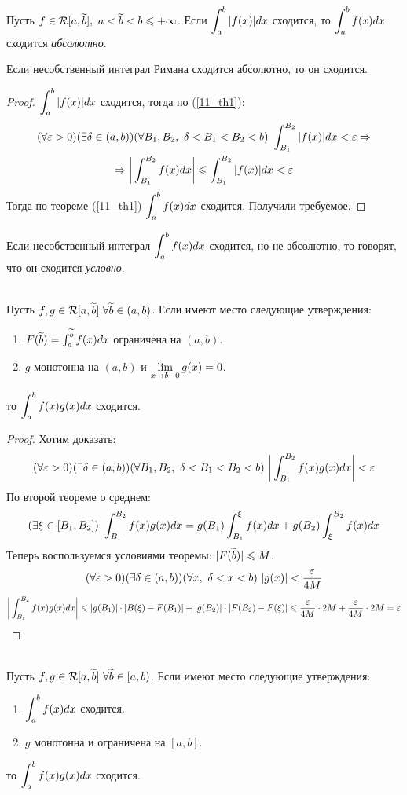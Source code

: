 \begin{definition}
	Пусть $f\in\mathcal R[a,\widetilde b],\ a<\widetilde b<b\leqslant+\infty$. Если $\displaystyle\int_a^b|f(x)|dx$ сходится, то $\displaystyle\int_a^bf(x)dx$ сходится \textit{абсолютно}.
\end{definition}
\begin{theorem}
	Если несобственный интеграл Римана сходится абсолютно, то он сходится.
\end{theorem}
\begin{proof}
	$\displaystyle\int_a^b|f(x)|dx$ сходится, тогда по (\ref{11_th1}):
	\begin{multline*}
		(\fa\eps>0)(\ex\delta\in(a,b))(\fa B_1,B_2,\ \delta<B_1<B_2<b)\ \int_{B_1}^{B_2}|f(x)|dx<\eps\Ra\\
		\Ra\bigg|\int_{B_1}^{B_2}f(x)dx\bigg|\le\int_{B_1}^{B_2}|f(x)|dx<\eps
	\end{multline*}
	Тогда по теореме (\ref{11_th1}) $\displaystyle\int_a^bf(x)dx$ сходится.
	Получили требуемое.
\end{proof}
\begin{definition}
	Если несобственный интеграл $\displaystyle\int_a^bf(x)dx$ сходится, но не абсолютно, то говорят, что он сходится \textit{условно}.
\end{definition}
\begin{theorem}\label{11_th4}\\
	Пусть $f,g\in\mathcal R[a,\widetilde b]\ \forall\widetilde b\in(a,b)$. Если имеют место следующие утверждения:
	\begin{enumerate}
		\item $F(\widetilde b)=\int_a^{\widetilde b}f(x)dx$ ограничена на $(a,b)$.
		\item $g$ монотонна на $(a,b)$ и $\lim_{x\ra b-0}g(x)=0$.
	\end{enumerate}
	то $\displaystyle\int_a^bf(x)g(x)dx$ сходится.
\end{theorem}
\begin{proof}
	Хотим доказать:
	\[(\fa\eps>0)(\ex\delta\in(a,b))(\fa B_1,B_2,\ \delta<B_1<B_2<b)\ \bigg|\int_{B_1}^{B_2}f(x)g(x)dx\bigg|<\eps\]
	По второй теореме о среднем:
	\[(\ex\xi\in[B_1,B_2])\ \int_{B_1}^{B_2}f(x)g(x)dx=g(B_1)\int_{B_1}^\xi f(x)dx+g(B_2)\int_\xi^{B_2}f(x)dx\]
	Теперь воспользуемся условиями теоремы: $|F(\widetilde b)|\leqslant M$.
	\[(\fa\eps>0)(\ex\delta\in(a,b))(\fa x,\ \delta<x<b)\ |g(x)|<\frac{\eps}{4M}\]
	\[\bigg|\int_{B_1}^{B_2}f(x)g(x)dx\bigg|\leqslant|g(B_1)|\cdot|B(\xi)-F(B_1)|+|g(B_2)|\cdot|F(B_2)-F(\xi)|\leqslant\frac{\varepsilon}{4M}\cdot2M+\frac{\varepsilon}{4M}\cdot2M=\varepsilon\]
\end{proof}
\begin{corollary}\\
	Пусть $f,g\in\mathcal R[a,\widetilde b]\ \forall\widetilde b\in[a,b)$. Если имеют место следующие утверждения:
	\begin{enumerate}
		\item $\displaystyle\int_a^bf(x)dx$ сходится.
		\item $g$ монотонна и ограничена на $[a,b]$.
	\end{enumerate}
	то $\displaystyle\int_a^bf(x)g(x)dx$ сходится.
\end{corollary}
